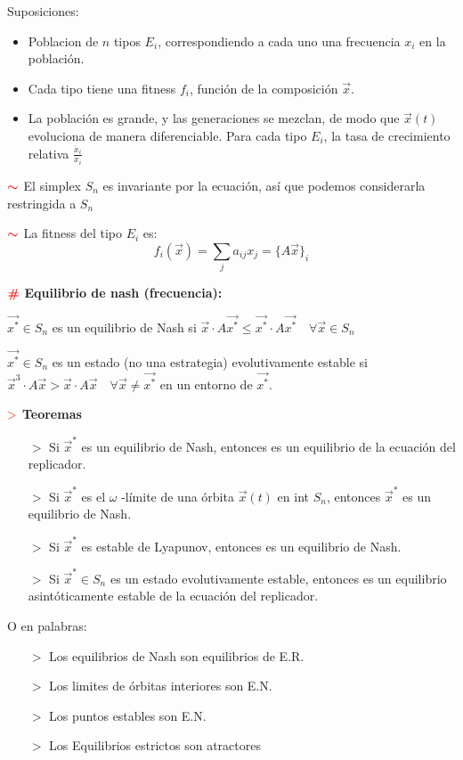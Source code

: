 \documentclass[%
 reprint,
 amsmath,amssymb,
 aps,
]{revtex4-1}
\newcommand{\propiedad}{\textcolor{red}{\mathbf{>}}}
\newcommand{\definir}{\color{red}{\textbf{\#}}}
\newcommand{\nota}{\textcolor{red}{\color{red}{\boldsymbol{\sim}}}}
\begin{document}
Suposiciones:
\begin{itemize}
  \item Poblacion de $n$ tipos $E_{i}$, correspondiendo a cada uno una frecuencia $x_{i}$ en la población.
  \item Cada tipo tiene una fitness $f_{i}$, función de la composición $\vec{x}$. 
  \item La población es grande, y las generaciones se mezclan, de modo que $\vec{x}(t)$ evoluciona de manera diferenciable. Para cada tipo $E_{i}$, la tasa de crecimiento relativa $\frac{\dot{x}_{i}}{x_{i}}$
\end{itemize}

$\nota$ El simplex $S_{n}$ es invariante por la ecuación, así que podemos considerarla restringida a $S_{n}$

$\nota$ La fitness del tipo $E_{i}$ es:
$$
f_{i}(\vec{x})=\sum_{j} a_{i j} x_{j}=\{A \vec{x}\}_{i}
$$

$\definir$ \textbf{Equilibrio de nash (frecuencia):}

$\vec{x^{*}} \in S_{n}$ es un equilibrio de Nash si
$\vec{x} \cdot A \vec{x^{*}} \leqslant \vec{x^{*}} \cdot A \vec{x^{*}} \quad \forall \vec{x} \in S_{n}$

$\vec{x^{*}} \in S_{n}$ es un estado (no una estrategia) evolutivamente estable si
$\vec{x}^{3} \cdot A \vec{x}>\vec{x} \cdot A \vec{x} \quad \forall \vec{x} \neq \vec{x^{*}}$ en un entorno de $\vec{x^{*}}$.

$\propiedad$ \textbf{Teoremas}

\begin{itemize}
  \item[$>$] Si $\vec{x}^{*}$ es un equilibrio de Nash, entonces es un equilibrio de la ecuación del replicador.
  \item[$>$] Si $\vec{x}^{*}$ es el $\omega$ -límite de una órbita $\vec{x}(t)$ en int $S_{n}$, entonces $\vec{x}^{*}$ es un equilibrio de Nash.
  \item[$>$] Si $\vec{x}^{*}$ es estable de Lyapunov, entonces es un equilibrio de Nash.
  \item[$>$] Si $\vec{x}^{*} \in S_{n}$ es un estado evolutivamente estable, entonces es un equilibrio asintóticamente estable de la ecuación del replicador.
\end{itemize}
O en palabras:
\begin{itemize}
  \item[$>$] Los equilibrios de Nash son equilibrios de E.R.
  \item[$>$] Los limites de órbitas interiores son E.N.
  \item[$>$] Los puntos estables son E.N.
  \item[$>$] Los Equilibrios estrictos son atractores
\end{itemize}
\end{document}
